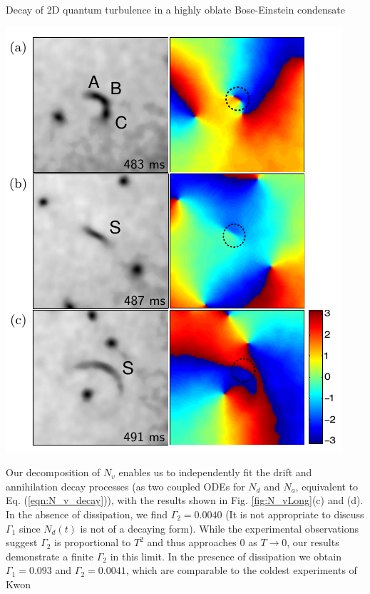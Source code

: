 \begin{chapter}{\label{cha:shin}Decay of 2D quantum turbulence in a highly oblate Bose-Einstein condensate}
\noindent\begin{minipage}{1\textwidth}
\begin{minipage}{0.45\textwidth}
\centering
\includegraphics[width=0.9\linewidth]{shin/fig5}
\end{minipage} \hfill
\begin{minipage}{0.5\textwidth}
Our decomposition of $N_v$ enables us to independently fit the drift and annihilation decay processes (as two coupled ODEs for $N_d$ and $N_a$, equivalent to Eq. (\ref{eqn:N_v_decay})), with the results shown in Fig. \ref{fig:N_vLong}(c) and (d).  In the absence of dissipation, we find $\Gamma_{2} = 0.0040$ (It is not appropriate to discuss $\Gamma_1$ since $N_d(t)$ is not of a decaying form). While the experimental observations \cite{kwon_moon_14} suggest $\Gamma_2$ is proportional to $T^2$ and thus approaches 0 as $T\rightarrow0$, our results demonstrate a finite $\Gamma_2$ in this limit.  In the presence of dissipation we obtain $\Gamma_{1} = 0.093$ and $\Gamma_{2} = 0.0041$, which are comparable to the coldest experiments of Kwon \etal
\end{minipage}
\end{minipage}



\end{chapter}
